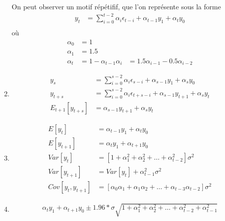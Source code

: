 \documentclass{article}
\begin{document}
\begin{enumerate}
  On peut observer un motif répétifif, que l'on représente sous la forme
  \begin{align*}
    y_t &= \sum_{i=0}^{t-2} \alpha_i\epsilon_{t-i} + \alpha_{t-1}y_1 + \alpha_t y_0 \\
  \end{align*}
  où 
  \begin{align*}
    \alpha_0 &= 1\\ 
    \alpha_1 &= 1.5\\
    \alpha_t &= 1-\alpha_{t-1}
    \alpha_i &= 1.5 \alpha_{i-1} - 0.5 \alpha_{i-2}
  \end{align*}
\item 
  \begin{align*}
    y_s &= \sum_{i=0}^{s-2} \alpha_i\epsilon_{s-i} + \alpha_{s-1}y_1 + \alpha_s y_0 \\
    y_{t+s} &= \sum_{i=0}^{s-2} \alpha_i\epsilon_{t+s-i} + \alpha_{s-1}y_{t+1} + \alpha_s y_t \\
    E_{t+1}\left[y_{t+s}\right] &= \alpha_{s-1} y_{t+1} + \alpha_s y_t
  \end{align*}

\item
  \begin{align*}
    E\left[y_t\right] &= \alpha_{t-1} y_1 + \alpha_t y_0 \\
    E\left[y_{t+1}\right] &= \alpha_{t} y_1 + \alpha_{t+1} y_0 \\
    Var\left[y_t\right] &= \left[1+\alpha_1^2 + \alpha_2^2 + \ldots + \alpha_{t-2}^2\right]\sigma^2 \\
    Var\left[y_{t+1}\right] &= Var\left[y_t\right] + \alpha_{t-1}^2 \sigma^2 \\
    Cov\left[y_{t},y_{t+1}\right] &= \left[\alpha_0\alpha_1 + \alpha_1\alpha_2 + \ldots + \alpha_{t-3}\alpha_{t-2}\right] \sigma^2
  \end{align*}
\item
  \begin{align*}
    \alpha_{t} y_1 + \alpha_{t+1} y_0 \pm 1.96 * \sigma \sqrt{1+\alpha_1^2 + \alpha_2^2 + \ldots + \alpha_{t-2}^2+\alpha_{t-1}^2}
  \end{align*}
\end{enumerate}

\clearpage

\end{document}
